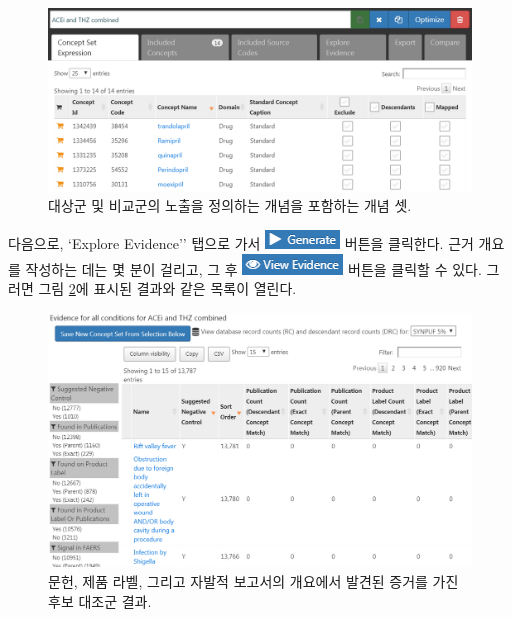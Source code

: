 \documentclass[10.5pt]{book}
\theoremstyle{definition}
\theoremstyle{definition}
\theoremstyle{definition}
\theoremstyle{remark}
\begin{document}
\begin{figure}

{\centering \includegraphics[width=1\linewidth]{images/MethodValidity/exposuresConceptSet} 

}

\caption{대상군 및 비교군의 노출을 정의하는 개념을 포함하는 개념 셋.}\label{fig:exposuresConceptSet}
\end{figure}

다음으로, `Explore Evidence'' 탭으로 가서
\includegraphics{images/MethodValidity/generate.png} 버튼을 클릭한다.
근거 개요를 작성하는 데는 몇 분이 걸리고, 그 후
\includegraphics{images/MethodValidity/viewEvidence.png} 버튼을 클릭할
수 있다. 그러면 그림 \ref{fig:candidateNcs}에 표시된 결과와 같은 목록이
열린다.

\begin{figure}

{\centering \includegraphics[width=1\linewidth]{images/MethodValidity/candidateNcs} 

}

\caption{문헌, 제품 라벨, 그리고 자발적 보고서의 개요에서 발견된 증거를 가진 후보 대조군 결과.}\label{fig:candidateNcs}
\end{figure}
\end{document}
